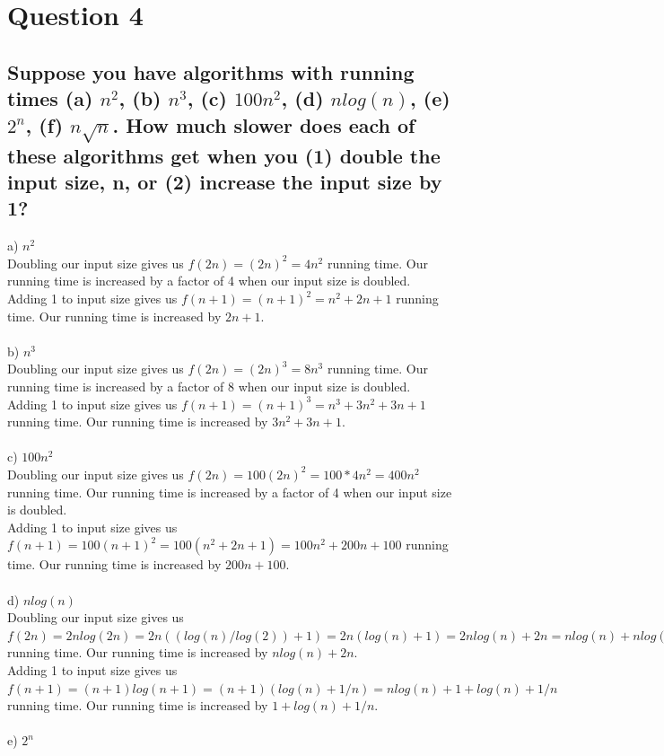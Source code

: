 \documentclass[11pt]{article}
\begin{document}
\section{Question 4}
\subsection{Suppose you have algorithms with running times (a) $ n^2 $, (b) $ n^3 $, (c) $ 100n^2 $, (d) $ nlog(n) $, (e) $ 2^n $, (f) $ n \sqrt n $. How much slower does each of these algorithms get when you (1) double the input size, n, or (2) increase the input size by 1?}

a) $ n^2 $\\
Doubling our input size gives us $ f(2n)=(2n)^2=4n^2 $ running time. Our running time is increased by a factor of 4 when our input size is doubled.\\
Adding 1 to input size gives us $ f(n+1)=(n+1)^2=n^2+2n+1 $ running time. Our running time is increased by $2n+1$.\\\\
b) $ n^3 $\\
Doubling our input size gives us $ f(2n)=(2n)^3=8n^3 $ running time. Our running time is increased by a factor of 8 when our input size is doubled.\\
Adding 1 to input size gives us $ f(n+1)=(n+1)^3=n^3+3n^2+3n+1 $ running time. Our running time is increased by $3n^2+3n+1$.\\\\
c) $ 100n^2 $\\
Doubling our input size gives us $ f(2n)=100(2n)^2=100*4n^2=400n^2 $ running time. Our running time is increased by a factor of 4 when our input size is doubled.\\
Adding 1 to input size gives us $ f(n+1)=100(n+1)^2=100(n^2+2n+1)=100n^2+200n+100 $ running time. Our running time is increased by $ 200n+100 $.\\\\
d) $ nlog(n) $\\
Doubling our input size gives us $ f(2n)=2nlog(2n)=2n((log(n)/log(2)) + 1)=2n(log(n)+1)=2nlog(n)+2n=nlog(n)+nlog(n)+2n $ running time. Our running time is increased by $nlog(n) + 2n$.\\
Adding 1 to input size gives us $ f(n+1)=(n+1)log(n+1)=(n+1)(log(n) + 1/n)= nlog(n) + 1 + log(n) + 1/n $ running time. Our running time is increased by $1 + log(n) + 1/n$.\\\\
e) $ 2^n $\\
\end{document}

